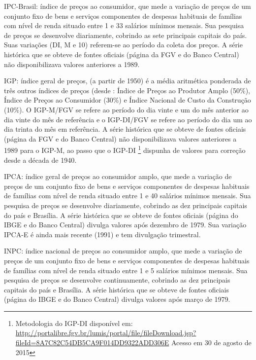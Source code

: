 \begin{compactitem}
\item IPC-Brasil: índice de preços ao consumidor, que mede a variação de preços de um conjunto fixo de bens e serviços componentes de despesas habituais de famílias com nível de renda situado entre 1 e 33 salários mínimos mensais. Sua pesquisa de preços se desenvolve diariamente, cobrindo as sete principais capitais do país. Suas variações (DI, M e 10) referem-se ao período da coleta dos preços. A série histórica que se obteve de fontes oficiais (página da FGV e do Banco Central) não disponibilizava valores anteriores a 1989.

\item IGP: índice geral de preços, (a partir de 1950) é a média aritmética ponderada de três outros índices de preços (desde : Índice de Preços ao Produtor Amplo (50\%), Índice de Preços ao Consumidor (30\%) e Índice Nacional de Custo da Construção (10\%). O IGP-M/FGV se refere ao período do dia vinte e um do mês anterior ao dia vinte do mês de referência e o IGP-DI/FGV se refere ao período do dia um ao dia trinta do mês em referência. A série histórica que se obteve de fontes oficiais (página da FGV e do Banco Central) não disponibilizava valores anteriores a 1989 para o IGP-M, ao passo que o IGP-DI
\footnote{Metodologia do IGP-DI disponível em: \url{http://portalibre.fgv.br/lumis/portal/file/fileDownload.jsp?fileId=8A7C82C54DB5CA9F014DD9322ADD306E} Acesso em 30 de agosto de 2015} dispunha de valores para correção desde a década de 1940.

\item IPCA: índice geral de preços ao consumidor amplo, que mede a variação de preços de um conjunto fixo de bens e serviços componentes de despesas habituais de famílias com nível de renda situado entre 1 e 40 salários mínimos mensais. Sua pesquisa de preços se desenvolve diariamente, cobrindo as dez principais capitais do país e Brasília. A série histórica que se obteve de fontes oficiais (página do IBGE e do Banco Central) divulga valores após dezembro de 1979. Sua variação IPCA-E é ainda mais recente (1991) e tem divulgação trimestral.

\item INPC: índice nacional de preços ao consumidor amplo, que mede a variação de preços de um conjunto fixo de bens e serviços componentes de despesas habituais de famílias com nível de renda situado entre 1 e 5 salários mínimos mensais. Sua pesquisa de preços se desenvolve continuamente, cobrindo as dez principais capitais do país e Brasília. A série histórica que se obteve de fontes oficiais (página do IBGE e do Banco Central) divulga valores após março de 1979.

\end{compactitem}


